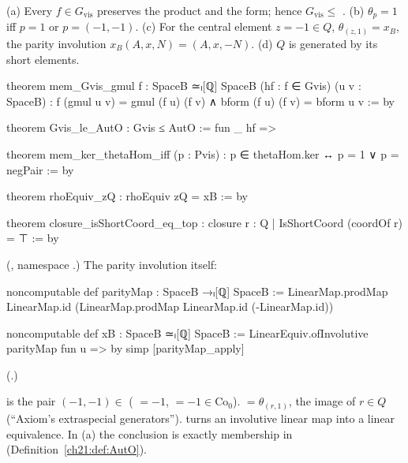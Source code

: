 \begin{theorem}\label{ch21:thm:gvis}
(a) Every $f\in G_{\mathrm{vis}}$ preserves the product and the form; hence $G_{\mathrm{vis}}\le$ .
(b) $\theta_p=1$ iff $p=1$ or $p=(-1,-1)$.
(c) For the central element $z=-1\in Q$, $\theta_{(z,1)}=x_B$, the parity involution
$x_B(A,x,N)=(A,x,-N)$.
(d) $Q$ is generated by its short elements.
\end{theorem}
\begin{leancode}
theorem mem_Gvis_gmul {f : SpaceB ≃ₗ[ℚ] SpaceB} (hf : f ∈ Gvis) (u v : SpaceB) :
    f (gmul u v) = gmul (f u) (f v) ∧ bform (f u) (f v) = bform u v := by
\end{leancode}
\begin{leancode}
theorem Gvis_le_AutO : Gvis ≤ AutO := fun _ hf =>
\end{leancode}
\begin{leancode}
theorem mem_ker_thetaHom_iff (p : Pvis) : p ∈ thetaHom.ker ↔ p = 1 ∨ p = negPair := by
\end{leancode}
\begin{leancode}
theorem rhoEquiv_zQ : rhoEquiv zQ = xB := by
\end{leancode}
\begin{leancode}
theorem closure_isShortCoord_eq_top : closure {r : Q | IsShortCoord (coordOf r)} = ⊤ := by
\end{leancode}
(, namespace .)  The parity
involution itself:
\begin{leancode}
noncomputable def parityMap : SpaceB →ₗ[ℚ] SpaceB :=
  LinearMap.prodMap LinearMap.id (LinearMap.prodMap LinearMap.id (-LinearMap.id))
\end{leancode}
\begin{leancode}
noncomputable def xB : SpaceB ≃ₗ[ℚ] SpaceB :=
  LinearEquiv.ofInvolutive parityMap fun u => by simp [parityMap_apply]
\end{leancode}
(.)
\begin{dictionary}
 is the pair $(-1,-1)\in$  ( $=-1$,  $=-1\in\mathrm{Co}_0$).
 $=\theta_{(r,1)}$, the image of $r\in Q$ (``Axiom's extraspecial generators'').
 turns an involutive linear map into a linear equivalence.
In (a) the conclusion is exactly membership in  (Definition~\ref{ch21:def:AutO}).
\end{dictionary}
